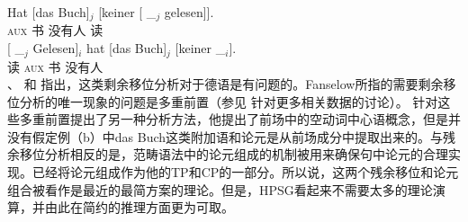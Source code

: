 \eal
\ex 
\gll {}Hat [das Buch]$_j$ [keiner [ \_$_j$ gelesen]].\\
	{}\textsc{aux} \spacebr{} 书 \spacebr{}没有人 \spacebr{}{} {} 读\\
\ex 
\gll {}[ \_$_j$ Gelesen]$_i$ hat [das Buch]$_j$ [keiner \_$_i$].\\
	{}\spacebr{}{} {} 读 \textsc{aux} \spacebr{} 书 \spacebr{}没有人\\
\zl
 \citet[]{Haider93a}、%
 \citet[\S~2]{dKM2001a}和 \citet{Fanselow2002a}指出，这类剩余移位分析对于德语是有问题的。Fanselow所指的需要剩余移位分析的唯一现象的问题是多重前置（参见 
针对更多相关数据的讨论）。 \citet{Mueller2005c,Mueller2005d,MuellerGS}针对这些多重前置提出了另一种分析方法，他提出了前场中的空动词中心语概念，但是并没有假定例（b）中das Buch这类附加语和论元是从前场成分中提取出来的。与残余移位分析相反的是，范畴语法\citep{Geach70a,HN94a}中的论元组成的机制被用来确保句中论元的合理实现。\citet[]{Chomsky2007a}已经将论元组成作为他的TP和CP的一部分。所以说，这两个残余移位和论元组合被看作是最近的最简方案的理论。但是，HPSG看起来不需要太多的理论演算，并由此在简约的推理方面更为可取。

